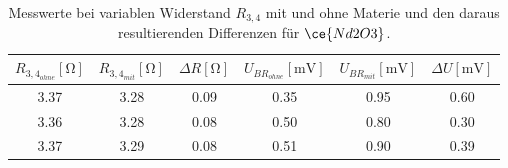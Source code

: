 \begin{table}
    \caption{Messwerte bei variablen Widerstand $R_{3,4}$ mit und ohne Materie und den daraus resultierenden Differenzen für $\ce{Nd2O3}$.}
    \centering
    \label{tab:3}
    \begin{tabular}{c c c | c c c}
        \toprule
        $R_{{3,4}_{ohne}} [\si{\ohm}]$ & $R_{{3,4}_{mit}} [\si{\ohm}]$ & $\Delta R [\si{\ohm}]$ & $U_{{BR}_{ohne}}[\si{\milli\volt}]$ & $U_{{BR}_{mit}}[\si{\milli\volt}]$ & $\Delta U [\si{\milli\volt}]$ \\
        \midrule
        3.37  & 3.28 & 0.09 & 0.35 & 0.95 & 0.60\\
        3.36  & 3.28 & 0.08 & 0.50 & 0.80 & 0.30\\
        3.37  & 3.29 & 0.08 & 0.51 & 0.90 & 0.39\\
        \bottomrule    
    \end{tabular}
\end{table}
